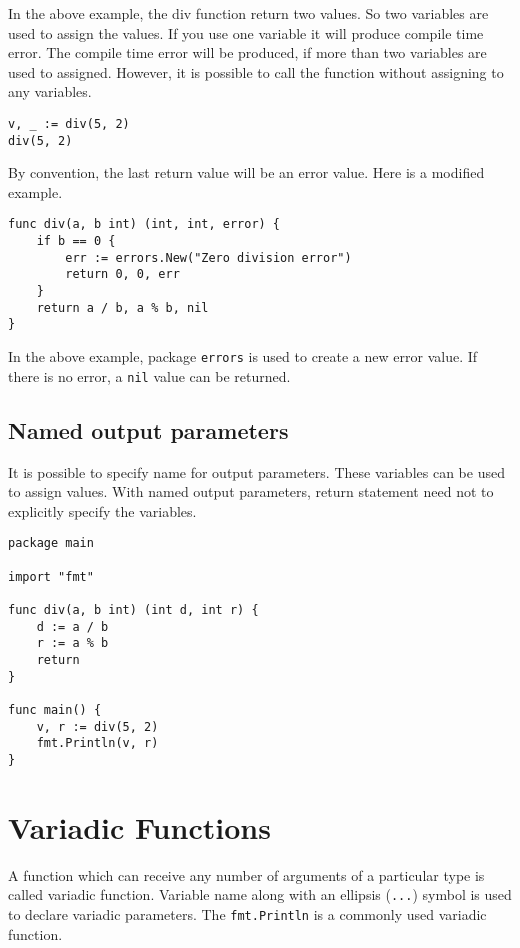 In the above example, the div function return two values.  So two
variables are used to assign the values.  If you use one variable it
will produce compile time error.  The compile time error will be
produced, if more than two variables are used to assigned.  However,
it is possible to call the function without assigning to any
variables.

\begin{lstlisting}[numbers=none]
v, _ := div(5, 2)
div(5, 2)
\end{lstlisting}

By convention, the last return value will be an error value.  Here is
a modified example.

\begin{lstlisting}[numbers=none]
func div(a, b int) (int, int, error) {
    if b == 0 {
        err := errors.New("Zero division error")
        return 0, 0, err
    }
    return a / b, a % b, nil
}
\end{lstlisting}

In the above example, package \texttt{errors} is used to create a new
error value.  If there is no error, a \texttt{nil} value can be
returned.

\subsection{Named output parameters}

It is possible to specify name for output
parameters.  These variables can be used
to assign values.  With named output parameters, return statement need
not to explicitly specify the variables.

\begin{lstlisting}
package main

import "fmt"

func div(a, b int) (int d, int r) {
    d := a / b
    r := a % b
    return
}

func main() {
    v, r := div(5, 2)
    fmt.Println(v, r)
}
\end{lstlisting}

\section{Variadic Functions}

A function which can
receive any number of arguments of a particular type is called
variadic function.  Variable name along with an ellipsis
(\texttt{...}) symbol is used to declare variadic parameters.
The \texttt{fmt.Println} is a commonly used variadic function.

